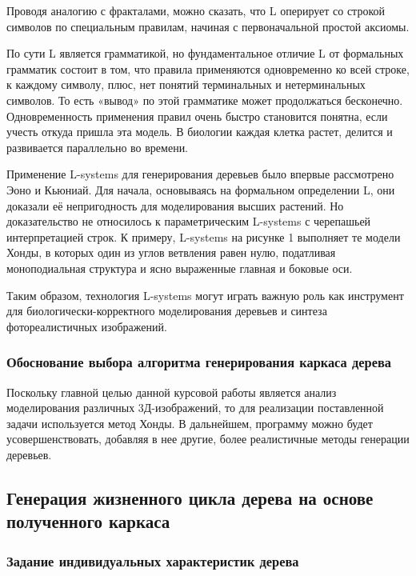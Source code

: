 \documentclass[54pt, a4paper]{article}
\begin{document}
	Проводя аналогию с фракталами, можно сказать, что L оперирует со строкой символов по специальным правилам, начиная с первоначальной простой аксиомы.

	
	По сути L является грамматикой, но фундаментальное отличие L от формальных грамматик состоит в том, что правила применяются одновременно ко всей строке, к каждому символу, плюс, нет понятий терминальных и нетерминальных символов. То есть «вывод» по этой грамматике может продолжаться бесконечно. Одновременность применения правил очень быстро становится понятна, если учесть откуда пришла эта модель. В биологии каждая клетка растет, делится и развивается параллельно во времени.

	
	Применение L-systems для генерирования деревьев было впервые рассмотрено Эоно и Кьюниай. Для начала, основываясь на формальном определении L, они доказали её непригодность для моделирования высших растений. Но доказательство не относилось к параметрическим L-systems с черепашьей интерпретацией строк. К примеру, L-systems на рисунке 1 выполняет те модели Хонды, в которых один из углов ветвления равен нулю, податливая моноподиальная структура и ясно выраженные главная и боковые оси.

	
	Таким образом, технология L-systems могут играть важную роль как инструмент для биологически-корректного моделирования деревьев и синтеза фотореалистичных изображений.
	
	
	
	\subsubsection{Обоснование выбора алгоритма генерирования каркаса дерева}
	
	Поскольку главной целью данной курсовой работы является анализ моделирования различных 3Д-изображений, то для реализации поставленной задачи используется метод Хонды. В дальнейшем, программу можно будет усовершенствовать, добавляя в нее другие, более реалистичные методы генерации деревьев.
	
	\subsection{Генерация жизненного цикла дерева на основе полученного каркаса}
	
	\subsubsection{Задание индивидуальных характеристик дерева} \label{uninque_ch}
	
\end{document}
